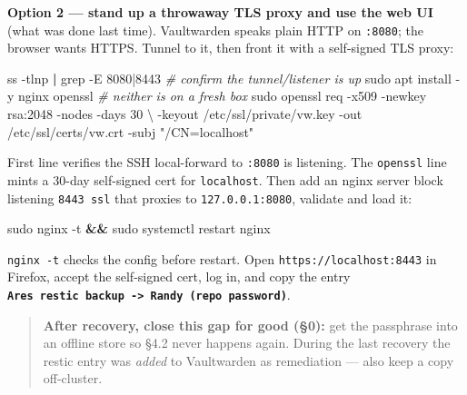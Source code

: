 \documentclass[
]{article}
\newenvironment{Shaded}{\begin{snugshade}}{\end{snugshade}}
\newcommand{\AttributeTok}[1]{\textcolor[rgb]{0.77,0.63,0.00}{#1}}
\newcommand{\CommentTok}[1]{\textcolor[rgb]{0.56,0.35,0.01}{\textit{#1}}}
\newcommand{\DataTypeTok}[1]{\textcolor[rgb]{0.13,0.29,0.53}{#1}}
\newcommand{\ExtensionTok}[1]{#1}
\newcommand{\FunctionTok}[1]{\textcolor[rgb]{0.00,0.00,0.00}{#1}}
\newcommand{\KeywordTok}[1]{\textcolor[rgb]{0.13,0.29,0.53}{\textbf{#1}}}
\newcommand{\NormalTok}[1]{#1}
\newcommand{\StringTok}[1]{\textcolor[rgb]{0.31,0.60,0.02}{#1}}
\begin{document}
\textbf{Option 2 --- stand up a throwaway TLS proxy and use the web UI}
(what was done last time). Vaultwarden speaks plain HTTP on
\texttt{:8080}; the browser wants HTTPS. Tunnel to it, then front it
with a self-signed TLS proxy:

\begin{Shaded}
\begin{Highlighting}[]
\ExtensionTok{ss} \AttributeTok{{-}tlnp} \KeywordTok{|} \FunctionTok{grep} \AttributeTok{{-}E} \StringTok{\textquotesingle{}8080|8443\textquotesingle{}}          \CommentTok{\# confirm the tunnel/listener is up}
\FunctionTok{sudo}\NormalTok{ apt install }\AttributeTok{{-}y}\NormalTok{ nginx openssl        }\CommentTok{\# neither is on a fresh box}
\FunctionTok{sudo}\NormalTok{ openssl req }\AttributeTok{{-}x509} \AttributeTok{{-}newkey}\NormalTok{ rsa:2048 }\AttributeTok{{-}nodes} \AttributeTok{{-}days}\NormalTok{ 30 }\DataTypeTok{\textbackslash{}}
  \AttributeTok{{-}keyout}\NormalTok{ /etc/ssl/private/vw.key }\AttributeTok{{-}out}\NormalTok{ /etc/ssl/certs/vw.crt }\AttributeTok{{-}subj} \StringTok{"/CN=localhost"}
\end{Highlighting}
\end{Shaded}

First line verifies the SSH local-forward to \texttt{:8080} is
listening. The \texttt{openssl} line mints a 30-day self-signed cert for
\texttt{localhost}. Then add an nginx server block listening
\texttt{8443\ ssl} that proxies to \texttt{127.0.0.1:8080}, validate and
load it:

\begin{Shaded}
\begin{Highlighting}[]
\FunctionTok{sudo}\NormalTok{ nginx }\AttributeTok{{-}t} \KeywordTok{\&\&} \FunctionTok{sudo}\NormalTok{ systemctl restart nginx}
\end{Highlighting}
\end{Shaded}

\texttt{nginx\ -t} checks the config before restart. Open
\texttt{https://localhost:8443} in Firefox, accept the self-signed cert,
log in, and copy the entry
\textbf{\texttt{Ares\ restic\ backup\ -\textgreater{}\ Randy\ (repo\ password)}}.

\begin{quote}
\textbf{After recovery, close this gap for good (§0):} get the
passphrase into an offline store so §4.2 never happens again. During the
last recovery the restic entry was \emph{added} to Vaultwarden as
remediation --- also keep a copy off-cluster.
\end{quote}
\end{document}

